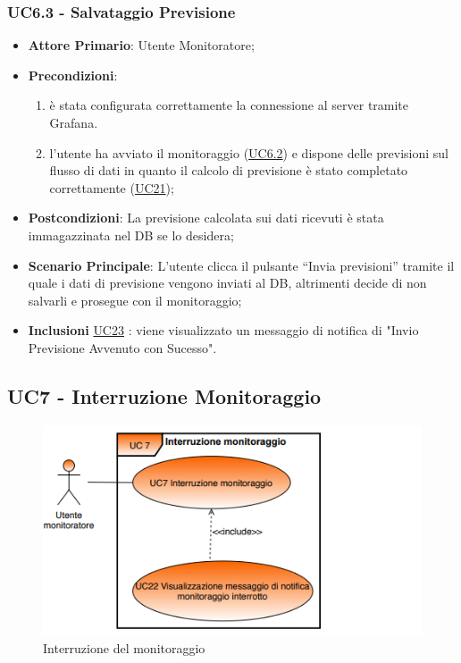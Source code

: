 	\subsubsection{UC6.3 - Salvataggio Previsione}
		\begin{itemize}
			\item\textbf{Attore Primario}: Utente Monitoratore;
			\item\textbf{Precondizioni}: 
				\begin{enumerate}
					\item è stata configurata correttamente la connessione al server tramite Grafana.	
					\item l’utente ha avviato il monitoraggio (\hyperref[par:UC6.2]{UC6.2}) e dispone delle previsioni sul flusso di dati in quanto il calcolo di previsione è stato completato correttamente  (\hyperref[par:UC21]{UC21});
				\end{enumerate}
			\item\textbf{Postcondizioni}: La previsione calcolata sui dati ricevuti è stata immagazzinata nel DB se lo desidera;
			\item\textbf{Scenario Principale}: L’utente clicca il pulsante “Invia previsioni” tramite il quale i dati di previsione vengono inviati al DB, altrimenti decide di non salvarli e prosegue con il monitoraggio;
			\item\textbf{Inclusioni} \hyperref[par:UC23]{UC23} : viene visualizzato un messaggio di notifica di "Invio Previsione Avvenuto con Sucesso".
		\end{itemize}	


	\label{par:UC7}
	\subsection{UC7 - Interruzione Monitoraggio}

	\begin{figure}[H]
		\centering
		\includegraphics[scale=0.80]{../Analisi_dei_requisiti/img/Diagrammi_UML/UC7_Interruzione_monitoraggio.png}
		\caption{Interruzione del monitoraggio}
	\end{figure}


